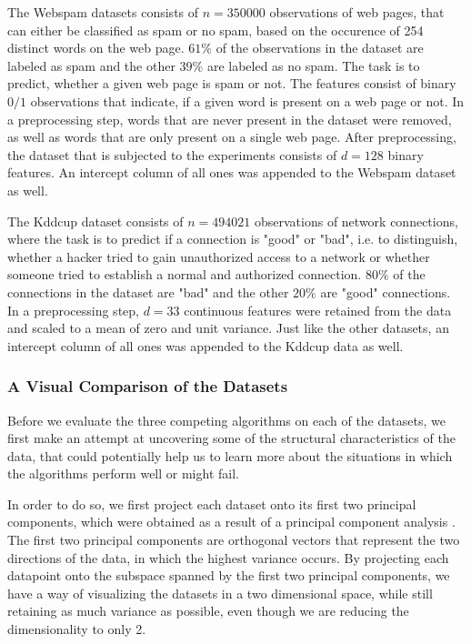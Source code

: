 The Webspam datasets consists of $n=350000$ observations of
web pages, that can either be classified as spam or no spam, based
on the occurence of 254 distinct words on the web page.
$61\%$ of the observations in the dataset are labeled as spam
and the other $39\%$ are labeled as no spam. The task is to predict,
whether a given web page is spam or not.
The features consist of binary $0/1$ observations that indicate, if
a given word is present on a web page or not.
In a preprocessing step, words that are never present
in the dataset were removed, as well
as words that are only present on a single web page.
After preprocessing, the dataset that is subjected to the
experiments consists of $d=128$ binary features.
An intercept column of all ones was appended to the Webspam dataset
as well.

The Kddcup dataset consists of $n=494021$ observations of network
connections, where the task is to predict if a connection is
"good" or "bad", i.e. to distinguish, whether a hacker tried
to gain unauthorized
access to a network or whether someone tried to establish a
normal and authorized connection.
$80\%$ of the connections in the dataset are "bad" and the other
$20\%$ are "good" connections.
In a preprocessing step, $d=33$ continuous features
were retained from the data and scaled to a mean of zero and
unit variance. Just like the other datasets, an intercept column
of all ones was appended to the Kddcup data as well.

\subsubsection{A Visual Comparison of the Datasets}

Before we evaluate the three competing algorithms on each of
the datasets, we first make an attempt at uncovering some of
the structural characteristics of the data, that could
potentially help us to learn more about the situations in which
the algorithms perform well or might fail.

In order to do so, we first project each dataset onto
its first two principal components, which were obtained
as a result of a principal component analysis
\cite{principal-components}.
The first two principal components are orthogonal vectors that
represent the two directions of the data,
in which the highest variance occurs.
By projecting each datapoint onto the subspace spanned by
the first two principal components, we have
a way of visualizing the datasets in a two dimensional space, while
still retaining as much variance as possible, even though we are
reducing the dimensionality to only 2.

